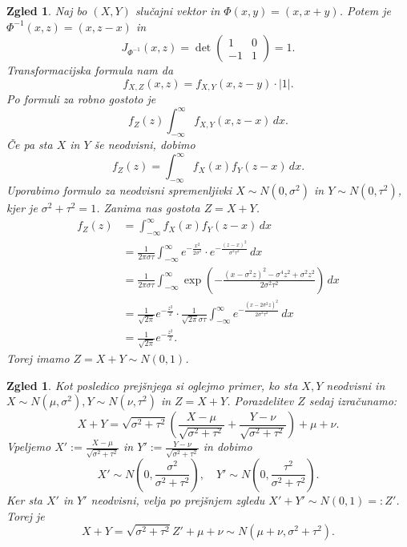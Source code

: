 \documentclass[10pt, a4paper]{article}
\newtheorem{zgled}[izr]{Zgled}
\begin{document}
\begin{zgled}
  Naj bo $(X, Y)$ slučajni vektor in $\Phi(x, y) = (x, x+ y)$.
  Potem je $\Phi^{-1} (x, z) = (x, z - x)$ in 
  $$J_{\Phi^{-1}} (x, z) = \det \begin{pmatrix}
    1 & 0\\
    -1 & 1
  \end{pmatrix} = 1.$$
  Transformacijska formula nam da 
  $$f_{X, Z} (x, z) = f_{X, Y} (x, z - y) \cdot |1|.$$
  Po formuli za robno gostoto je 
  $$f_{Z} (z) \int_{-\infty} ^\infty f_{X, Y} (x, z - x)\, dx.$$
  Če pa sta $X$ in $Y$ še neodvisni, dobimo 
  $$f_Z(z) = \int_{-\infty} ^\infty f_X (x) f_Y (z - x)\, dx.$$
  Uporabimo formulo za neodvisni spremenljivki $X \sim N(0, \sigma^2)$ in $Y \sim N(0, \tau^2)$,
  kjer je $\sigma^2 + \tau^2 = 1$. Zanima nas gostota $Z = X + Y$.
  \begin{align*}
    f_Z(z) &= \int_{-\infty} ^\infty f_X (x) f_Y (z - x)\, dx\\
    &= \frac{1}{2 \pi \sigma \tau} \int_{-\infty} ^\infty e^{-\frac{x^2}{2 \sigma^2}} \cdot e^{-\frac{(z - x)^2}{\sigma^2 \tau^2}}\, dx\\
    &= \frac{1}{2 \pi \sigma \tau} \int_{-\infty} ^\infty \exp \left(-\frac{(x - \sigma^2 z)^2 - \sigma^4 z^2 + \sigma^2 z^2}{2 \sigma^2 \tau^2}\right)\, dx\\
    &= \frac{1}{\sqrt{2 \pi}} e^{-\frac{z^2}{2}} \cdot \frac{1}{\sqrt{2 \pi} \sigma \tau} \int_{-\infty} ^\infty e^{-\frac{(x - 2 \sigma^2 z)^2}{2 \sigma^2 \tau^2}}\, dx\\
    &= \frac{1}{\sqrt{2 \pi}} e^{-\frac{z^2}{2}}.
  \end{align*}
  Torej imamo $Z = X + Y \sim N(0, 1)$.
\end{zgled}

\begin{zgled}
Kot posledico prejšnjega si oglejmo primer, ko sta $X, Y$ neodvisni in $X \sim N(\mu, \sigma^2), Y \sim N(\nu, \tau^2)$ in $Z = X + Y$.
Porazdelitev $Z$ sedaj izračunamo:
$$X + Y = \sqrt{\sigma^2 + \tau^2} \left(\frac{X - \mu}{\sqrt{\sigma^2 + \tau^2}} + \frac{Y - \nu}{\sqrt{\sigma^2 + \tau^2}}\right) + \mu + \nu.$$
Vpeljemo $X' := \frac{X - \mu}{\sqrt{\sigma^2 + \tau^2}} $ in $Y' :=\frac{Y - \nu}{\sqrt{\sigma^2 + \tau^2}}$ in dobimo 
$$X' \sim N\left(0, \frac{\sigma^2}{\sigma^2 + \tau^2}\right), \quad Y' \sim N\left(0, \frac{\tau^2}{\sigma^2 + \tau^2}\right).$$
Ker sta $X'$ in $Y'$ neodvisni, velja po prejšnjem zgledu $X' + Y' \sim N(0, 1) =: Z'$.
Torej je $$X + Y = \sqrt{\sigma^2 + \tau^2} Z' + \mu + \nu \sim N(\mu + \nu, \sigma^2 + \tau^2).$$
\end{zgled}
\end{document}
